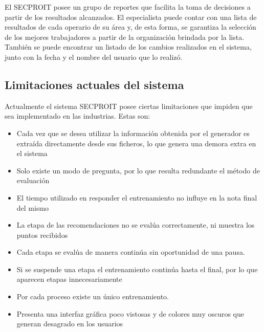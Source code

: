 El SECPROIT posee un grupo de reportes que facilita la toma de decisiones a partir de los resultados alcanzados. El especialista puede contar con una lista de resultados de cada operario de su área y, de esta forma, se garantiza la selección de los mejores trabajadores a partir de la organización brindada por la lista. También se puede encontrar un listado de los cambios realizados en el sistema, junto con la fecha y el nombre del usuario que lo realizó.

\subsection{Limitaciones actuales del sistema}
Actualmente el sistema SECPROIT posee ciertas limitaciones que impiden que sea implementado en las industrias. Estas son:
\begin{itemize}
\item Cada vez que se desea utilizar la información obtenida por el generador es extraída directamente desde sus ficheros, lo que genera una demora extra en el sistema
\item Solo existe un modo de pregunta, por lo que resulta redundante el método de evaluación
\item El tiempo utilizado en responder el entrenamiento no influye en la nota final del mismo
\item La etapa de las recomendaciones no se evalúa correctamente, ni muestra los puntos recibidos
\item Cada etapa se evalúa de manera continúa sin oportunidad de una pausa.
\item Si se suspende una etapa el entrenamiento continúa hasta el final, por lo que aparecen etapas innecesariamente
\item Por cada proceso existe un único entrenamiento.
\item Presenta una interfaz gráfica poco vistosas y de colores muy oscuros que generan desagrado en los usuarios
\end{itemize}


